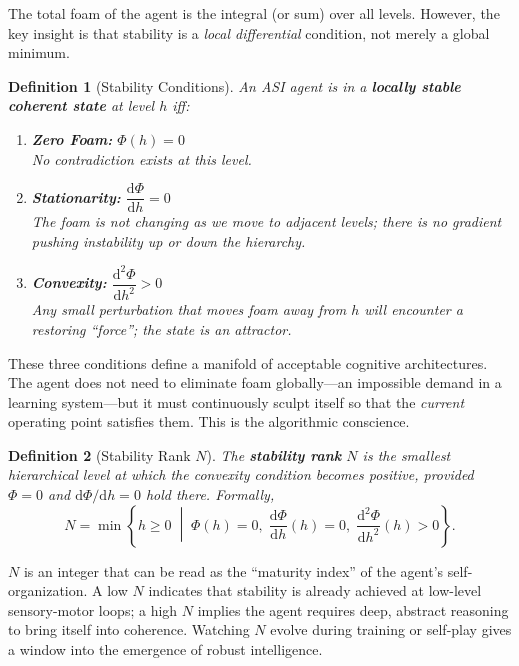 \documentclass[11pt,a4paper]{article}
\newtheorem{definition}{Definition}[section]
\begin{document}
The total foam of the agent is the integral (or sum) over all levels. However, the key insight is that stability is a \emph{local differential} condition, not merely a global minimum.

\begin{definition}[Stability Conditions]
An ASI agent is in a \textbf{locally stable coherent state} at level $h$ iff:
\begin{enumerate}
    \item \textbf{Zero Foam:} $\Phi(h) = 0$ \\
    No contradiction exists at this level.
    \item \textbf{Stationarity:} $\dfrac{\mathrm{d}\Phi}{\mathrm{d}h} = 0$ \\
    The foam is not changing as we move to adjacent levels; there is no gradient pushing instability up or down the hierarchy.
    \item \textbf{Convexity:} $\dfrac{\mathrm{d}^2\Phi}{\mathrm{d}h^2} > 0$ \\
    Any small perturbation that moves foam away from $h$ will encounter a restoring ``force''; the state is an attractor.
\end{enumerate}
\end{definition}

These three conditions define a manifold of acceptable cognitive architectures. The agent does not need to eliminate foam globally---an impossible demand in a learning system---but it must continuously sculpt itself so that the \emph{current} operating point satisfies them. This is the algorithmic conscience.

\begin{definition}[Stability Rank $N$]
The \textbf{stability rank} $N$ is the smallest hierarchical level at which the convexity condition becomes positive, provided $\Phi = 0$ and $\mathrm{d}\Phi/\mathrm{d}h = 0$ hold there. Formally,
\begin{equation}\label{eq:stability_rank}
    N = \min\left\{ h \geq 0 \;\middle|\; \Phi(h)=0,\; \frac{\mathrm{d}\Phi}{\mathrm{d}h}(h)=0,\; \frac{\mathrm{d}^2\Phi}{\mathrm{d}h^2}(h) > 0 \right\}.
\end{equation}
\end{definition}

$N$ is an integer that can be read as the ``maturity index'' of the agent's self-organization. A low $N$ indicates that stability is already achieved at low-level sensory-motor loops; a high $N$ implies the agent requires deep, abstract reasoning to bring itself into coherence. Watching $N$ evolve during training or self-play gives a window into the emergence of robust intelligence.
\end{document}
